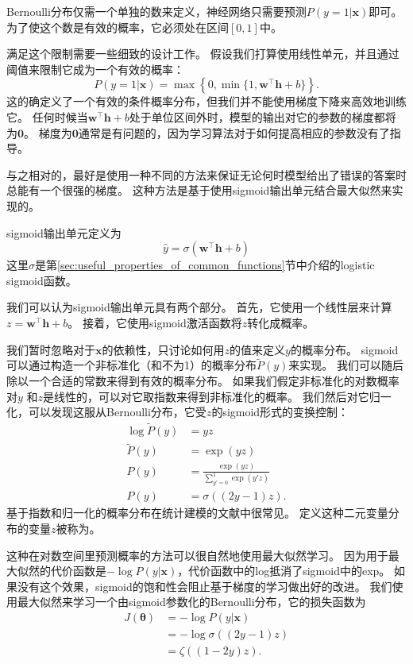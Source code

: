 Bernoulli分布仅需一个单独的数来定义，神经网络只需要预测$P(y =1|\bm{x})$即可。
为了使这个数是有效的概率，它必须处在区间$[0, 1]$中。

满足这个限制需要一些细致的设计工作。
假设我们打算使用线性单元，并且通过阈值来限制它成为一个有效的概率：
\begin{equation}
P(y=1 | \bm{x}) = \max \left \{ 0, \min \{1, \bm{w}^\top \bm{h}+b \} \right \}.
\end{equation}
这的确定义了一个有效的条件概率分布，但我们并不能使用梯度下降来高效地训练它。
任何时候当$\bm{w}^\top \bm{h}+b$处于单位区间外时，模型的输出对它的参数的梯度都将为$\bm{0}$。
梯度为$\bm{0}$通常是有问题的，因为学习算法对于如何提高相应的参数没有了指导。


与之相对的，最好是使用一种不同的方法来保证无论何时模型给出了错误的答案时总能有一个很强的梯度。
这种方法是基于使用sigmoid输出单元结合最大似然来实现的。

sigmoid输出单元定义为
\begin{equation}
\hat{y} = \sigma \left (\bm{w}^\top \bm{h} + b \right )
\end{equation}
这里$\sigma$是第\ref{sec:useful_properties_of_common_functions}节中介绍的logistic sigmoid函数。

我们可以认为sigmoid输出单元具有两个部分。
首先，它使用一个线性层来计算$z=\bm{w}^\top \bm{h}+b$。
接着，它使用sigmoid激活函数将$z$转化成概率。

我们暂时忽略对于$\bm{x}$的依赖性，只讨论如何用$z$的值来定义$y$的概率分布。
sigmoid可以通过构造一个非标准化（和不为1）的概率分布$\tilde{P}(y)$来实现。
我们可以随后除以一个合适的常数来得到有效的概率分布。
如果我们假定非标准化的对数概率对$y$ 和$z$是线性的，可以对它取指数来得到非标准化的概率。
我们然后对它归一化，可以发现这服从Bernoulli分布，它受$z$的sigmoid形式的变换控制：
\begin{align}
\log \tilde{P}(y) &= yz\\
\tilde{P}(y) &= \exp(yz)\\
P(y) &= \frac{\exp(yz)}{\sum_{y' = 0}^1 \exp(y' z)}\\
P(y) &= \sigma((2y-1)z).
\end{align}
基于指数和归一化的概率分布在统计建模的文献中很常见。
定义这种二元变量分布的变量$z$被称为。


这种在对数空间里预测概率的方法可以很自然地使用最大似然学习。
因为用于最大似然的代价函数是$-\log P(y|\bm{x})$，代价函数中的log抵消了sigmoid中的exp。
如果没有这个效果，sigmoid的饱和性会阻止基于梯度的学习做出好的改进。
我们使用最大似然来学习一个由sigmoid参数化的Bernoulli分布，它的损失函数为
\begin{align}
J(\bm{\theta}) &= -\log P(y|\bm{x})\\
&= -\log \sigma ((2y-1)z)\\
&= \zeta((1-2y)z).
\end{align}

